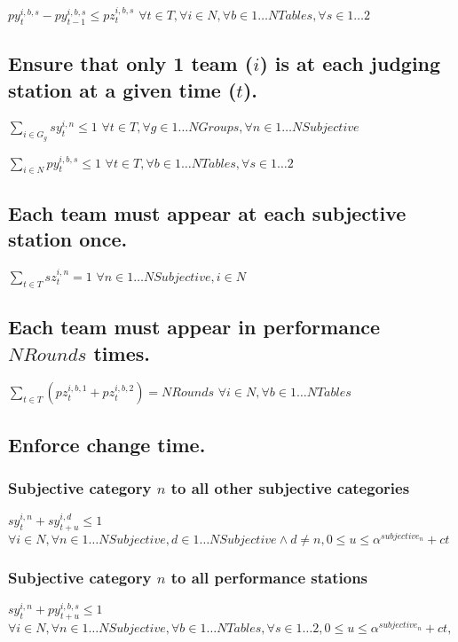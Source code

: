 \documentclass[letterpaper,11pt]{report}
\begin{document}
$py_{t}^{i,b,s} - py_{t-1}^{i,b,s} \le pz_{t}^{i,b,s}$
\hfill $\forall t \in T, \forall i \in N, \forall b \in 1 \dots NTables,
\forall s \in 1 \dots 2$


\subsection{Ensure that only 1 team ($i$) is at each judging station at a
given time ($t$).}
\label{judging_group_constraint}
$\sum\limits_{i \in G_{g}} sy_{t}^{i,n} \le 1$          
\hfill $\forall t \in T, \forall g \in 1 \dots NGroups,
\forall n \in 1 \dots NSubjective$

$\sum\limits_{i \in N} py_{t}^{i,b,s} \le 1$          
\hfill $\forall t \in T, \forall b \in 1 \dots NTables,
\forall s \in 1 \dots 2$


\subsection{Each team must appear at each subjective station once.}
$\sum\limits_{t \in T} sz_{t}^{i,n} = 1$
\hfill $\forall n \in 1 \dots NSubjective, i \in N$

\subsection{Each team must appear in performance $NRounds$ times.}
$\sum\limits_{t \in T} ( pz_{t}^{i,b,1} + pz_{t}^{i,b,2} ) = NRounds$
\hfill $\forall i \in N, \forall b \in 1 \dots NTables$


\subsection{Enforce change time.}

\subsubsection{Subjective category $n$ to all other subjective categories}
$sy_{t}^{i,n} + sy_{t+u}^{i,d} \le 1$
\hfill $\forall i \in N,
\forall n \in 1 \dots NSubjective, 
d \in 1 \dots NSubjective \wedge d \neq n,
0 \le u \le \alpha^{subjective_{n}} + ct$

\subsubsection{Subjective category $n$ to all performance stations}
$sy_{t}^{i,n} + py_{t+u}^{i,b,s} \le 1$
\hfill $\forall i \in N,
\forall n \in 1 \dots NSubjective, 
\forall b \in 1 \dots NTables,
\forall s \in 1 \dots 2,
0 \le u \le \alpha^{subjective_{n}}+ ct,$
\end{document}
